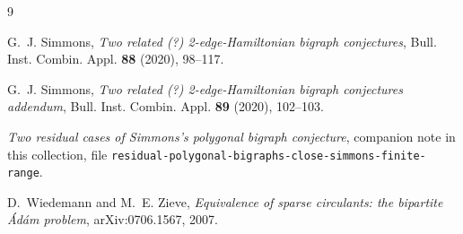 \documentclass[11pt]{amsart}
\begin{document}
\begin{thebibliography}{9}

G.~J. Simmons,
\emph{Two related (?) 2-edge-Hamiltonian bigraph conjectures},
Bull. Inst. Combin. Appl. \textbf{88} (2020), 98--117.

G.~J. Simmons,
\emph{Two related (?) 2-edge-Hamiltonian bigraph conjectures addendum},
Bull. Inst. Combin. Appl. \textbf{89} (2020), 102--103.

\emph{Two residual cases of Simmons's polygonal bigraph conjecture},
companion note in this collection, file
\texttt{residual-polygonal-bigraphs-\allowbreak close-simmons-finite-range}.

D.~Wiedemann and M.~E. Zieve,
\emph{Equivalence of sparse circulants: the bipartite \'Ad\'am problem},
arXiv:0706.1567, 2007.

\end{thebibliography}
\end{document}
